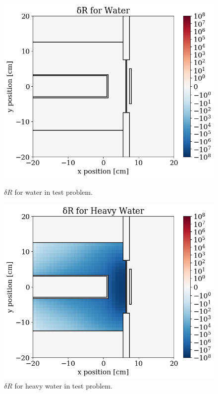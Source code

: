 \begin{figure}
\begin{minipage}{0.495\linewidth}
    \label{fig:tp:dR_06}
  \end{minipage}
  \begin{minipage}{0.495\linewidth}
    \centering
    \includegraphics[width=\linewidth]{content/testprob/dR_14.png}
    \caption{$\delta R$ for water in test problem.}
    \label{fig:tp:dR_14}
  \end{minipage}
  \hfill
  \begin{minipage}{0.495\linewidth}
    \centering
    \includegraphics[width=\linewidth]{content/testprob/dR_13.png}
    \caption{$\delta R$ for heavy water in test problem.}

\end{minipage}
\end{figure}

